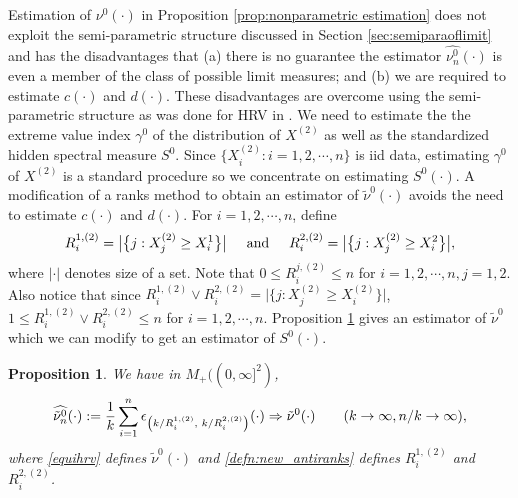 \documentclass[11 pt]{amsart}
\newtheorem{prop}[thm]{Proposition}
\numberwithin{equation}{section}
\begin{document}
{{Estimation of $\nu^0 (\cdot)$  in Proposition \ref{prop:nonparametric
  estimation} 
 does not exploit the semi-parametric structure
discussed in Section \ref{sec:semiparaoflimit} and has the disadvantages
 that (a) there
is no guarantee the estimator $\widehat{ \nu_n^0 }(\cdot)$ is 
 even a member of the class of possible limit measures; and (b) we are
 required to estimate $c(\cdot)$ and $d(\cdot)$.
These disadvantages are overcome using the
semi-parametric structure as was done for
 HRV in
\citep{mitra:resnick:2010a}.
We  need to estimate the the extreme
value index $\gamma^0$  of the distribution of $X^{(2)}$ as well as  the standardized
hidden spectral measure $S^0$.  Since $\{ X^{(2)}_i: i = 1, 2, \cdots,
n \}$ is iid data, estimating $\gamma^0$ of $X^{(2)}$ is a standard procedure \citep[page
65]{dehaan:ferreira:2006} so we concentrate on estimating
$S^0(\cdot)$. A modification of a
ranks method \citep{huang:1992,dehaan:ferreira:2006,
  heffernan:resnick:2005,
resnickbook:2007}
to obtain an estimator of  
$\tilde \nu^0(\cdot)$ avoids the need to estimate $c(\cdot)$ and $d(\cdot)$.
For $i =1, 2, \cdots,n$, define
\begin{align}\label{defn:new_antiranks}
R^{1, (2)}_i = \big{|} \big\{ j: X^{(2)}_j \ge X^1_i \bigr\} \big{|}
\hskip 0.5 cm \hbox{and} \hskip 0.5 cm  R^{2, (2)}_i = \big{|} \bigl\{
  j: X^{(2)}_j \ge X^2_i \bigr\} \big{|}, 
\end{align}
where $|\cdot |$ denotes size of  a set. Note that $0 \le R^{j, (2)}_i
\le n$ for $i = 1, 2, \cdots, n, j = 1, 2$. Also notice that since
$R^{1, (2)}_i \vee R^{2,(2)}_i = {|} \{ j: X^{(2)}_j \ge
  X^{(2)}_i \} {|}$, $1 \le R^{1, (2)}_i \vee R^{2,(2)}_i
\le n$ for $i = 1, 2, \cdots, n$. Proposition \ref{prop:tildenu0}
gives an
estimator of $\tilde \nu^0$ which we can modify to get an estimator of $S^0(\cdot)$.

\begin{prop}\label{prop:tildenu0} 
{We have in $M_+((0, \infty]^2)$,}
\begin{align}\label{eqn:tildenu0estimate}
\widehat{\tilde \nu^0_n} (\cdot) :=\frac{1}{k} \sum_{i=1}^n
\epsilon_{\left(k/R^{1, (2)}_i, \hskip 0.1 cm 
    k/R^{2, (2)}_i \right)}(\cdot) \Rightarrow \tilde \nu^0(\cdot)
\qquad (k \to \infty, n/k \to \infty),
\end{align}
 where \eqref{equihrv} defines 
$\tilde \nu^0(\cdot)$   and \eqref{defn:new_antiranks} defines $R^{1, (2)}_i$ and $R^{2, (2)}_i$.
\end{prop}

}}
\end{document}

